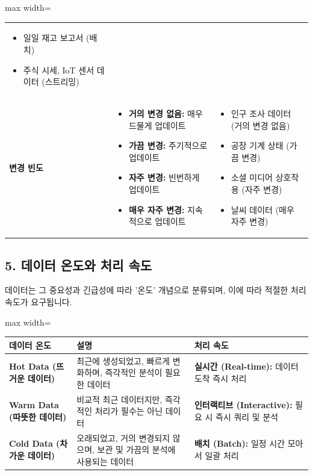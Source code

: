 \documentclass[11pt,a4paper]{article}
\theoremstyle{definition}
\begin{document}
\begin{adjustbox}{max width=\textwidth}
\begin{tabular}{lll}
\begin{itemize}
    \item 일일 재고 보고서 (배치)
    \item 주식 시세, IoT 센서 데이터 (스트리밍)
\end{itemize} \\
\textbf{변경 빈도} &
\begin{itemize}
    \item \textbf{거의 변경 없음:} 매우 드물게 업데이트
    \item \textbf{가끔 변경:} 주기적으로 업데이트
    \item \textbf{자주 변경:} 빈번하게 업데이트
    \item \textbf{매우 자주 변경:} 지속적으로 업데이트
\end{itemize} &
\begin{itemize}
    \item 인구 조사 데이터 (거의 변경 없음)
    \item 공장 기계 상태 (가끔 변경)
    \item 소셜 미디어 상호작용 (자주 변경)
    \item 날씨 데이터 (매우 자주 변경)
\end{itemize} \\
\bottomrule
\end{tabular}
\end{adjustbox}

\subsection*{5. 데이터 온도와 처리 속도}

데이터는 그 중요성과 긴급성에 따라 '온도' 개념으로 분류되며, 이에 따라 적절한 처리 속도가 요구됩니다.

\begin{adjustbox}{max width=\textwidth}
\begin{tabular}{lll}
\toprule
\textbf{데이터 온도} & \textbf{설명} & \textbf{처리 속도} \\
\midrule
\textbf{Hot Data (뜨거운 데이터)} & 최근에 생성되었고, 빠르게 변화하며, 즉각적인 분석이 필요한 데이터 & \textbf{실시간 (Real-time):} 데이터 도착 즉시 처리 \\
\textbf{Warm Data (따뜻한 데이터)} & 비교적 최근 데이터지만, 즉각적인 처리가 필수는 아닌 데이터 & \textbf{인터랙티브 (Interactive):} 필요 시 즉시 쿼리 및 분석 \\
\textbf{Cold Data (차가운 데이터)} & 오래되었고, 거의 변경되지 않으며, 보관 및 가끔의 분석에 사용되는 데이터 & \textbf{배치 (Batch):} 일정 시간 모아서 일괄 처리 \\
\bottomrule
\end{tabular}
\end{adjustbox}
\end{document}
